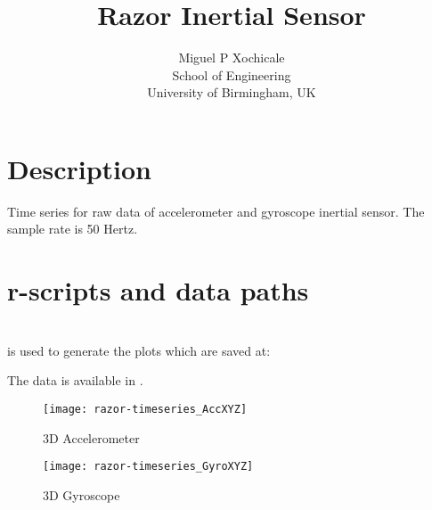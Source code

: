 \documentclass[a4paper,12pt]{article}
\title{Razor Inertial Sensor}
\author{Miguel P Xochicale \\
School of Engineering\\
University of Birmingham, UK}
\begin{document}
\maketitle



\section{Description}
Time series for raw data of accelerometer and gyroscope inertial sensor.
The sample rate is 50 Hertz. 


\section{r-scripts and data paths}
 \\
is used to generate the plots which are saved at: \\

The data is available in \cite{mxochicale2018}.









\begin{figure}
\centering
\texttt{[image: razor-timeseries\_AccXYZ]}
\caption{3D Accelerometer}
\end{figure}

\begin{figure}
\centering
\texttt{[image: razor-timeseries\_GyroXYZ]}
\caption{3D Gyroscope}
\end{figure}
\end{document}
